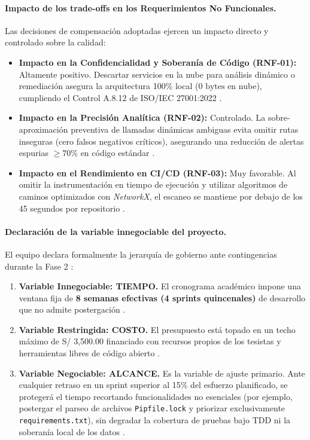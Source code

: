 \paragraph{Impacto de los trade-offs en los Requerimientos No Funcionales.}
Las decisiones de compensación adoptadas ejercen un impacto directo y controlado sobre la calidad:
\begin{itemize}[leftmargin=1.27cm]
    \item \textbf{Impacto en la Confidencialidad y Soberanía de Código (RNF-01):} Altamente positivo. Descartar servicios en la nube para análisis dinámico o remediación asegura la arquitectura 100\% local ($0\text{ bytes}$ en nube), cumpliendo el Control A.8.12 de ISO/IEC 27001:2022 \parencite{ladisa2023sok}. %
    \item \textbf{Impacto en la Precisión Analítica (RNF-02):} Controlado. La sobre-aproximación preventiva de llamadas dinámicas ambiguas evita omitir rutas inseguras (cero falsos negativos críticos), asegurando una reducción de alertas espurias $\ge 70\%$ en código estándar \parencite{pashchenko2022vuln4real, nielson1999principles}. %
    \item \textbf{Impacto en el Rendimiento en CI/CD (RNF-03):} Muy favorable. Al omitir la instrumentación en tiempo de ejecución y utilizar algoritmos de caminos optimizados con \textit{NetworkX}, el escaneo se mantiene por debajo de los 45 segundos por repositorio \parencite{hagberg2008exploring}. %
\end{itemize}

\paragraph{Declaración de la variable innegociable del proyecto.}
El equipo declara formalmente la jerarquía de gobierno ante contingencias durante la Fase 2 \parencite{torres2026proyecto}: %
\begin{enumerate}[leftmargin=1.27cm, label=\arabic*.]
    \item \textbf{Variable Innegociable: TIEMPO.} El cronograma académico impone una ventana fija de \textbf{8 semanas efectivas (4 sprints quincenales)} de desarrollo que no admite postergación \parencite{torres2026proyecto}. %
    \item \textbf{Variable Restringida: COSTO.} El presupuesto está topado en un techo máximo de S/ 3,500.00 financiado con recursos propios de los tesistas y herramientas libres de código abierto \parencite{torres2026proyecto}. %
    \item \textbf{Variable Negociable: ALCANCE.} Es la variable de ajuste primario. Ante cualquier retraso en un sprint superior al 15\% del esfuerzo planificado, se protegerá el tiempo recortando funcionalidades no esenciales (por ejemplo, postergar el parseo de archivos \texttt{Pipfile.lock} y priorizar exclusivamente \texttt{requirements.txt}), sin degradar la cobertura de pruebas bajo TDD ni la soberanía local de los datos \parencite{wiegers2013software, torres2026proyecto}. %
\end{enumerate}

